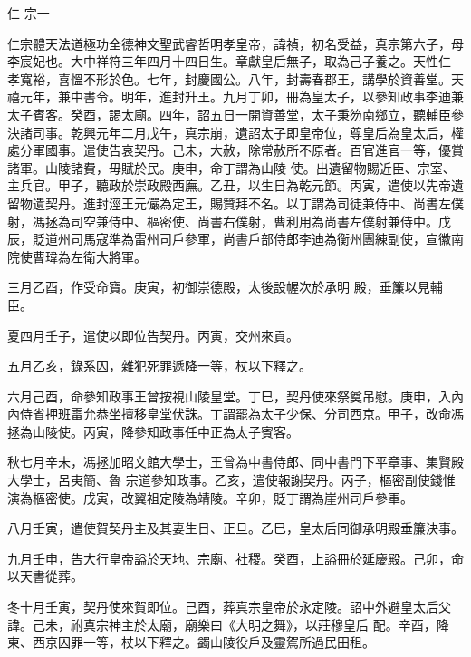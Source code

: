 
\begin{pinyinscope}

 仁
 宗一



 仁宗體天法道極功全德神文聖武睿哲明孝皇帝，諱禎，初名受益，真宗第六子，母李宸妃也。大中祥符三年四月十四日生。章獻皇后無子，取為己子養之。天性仁
 孝寬裕，喜慍不形於色。七年，封慶國公。八年，封壽春郡王，講學於資善堂。天禧元年，兼中書令。明年，進封升王。九月丁卯，冊為皇太子，以參知政事李迪兼太子賓客。癸酉，謁太廟。四年，詔五日一開資善堂，太子秉笏南鄉立，聽輔臣參決諸司事。乾興元年二月戊午，真宗崩，遺詔太子即皇帝位，尊皇后為皇太后，權處分軍國事。遣使告哀契丹。己未，大赦，除常赦所不原者。百官進官一等，優賞諸軍。山陵諸費，毋賦於民。庚申，命丁謂為山陵
 使。出遺留物賜近臣、宗室、主兵官。甲子，聽政於崇政殿西廡。乙丑，以生日為乾元節。丙寅，遣使以先帝遺留物遺契丹。進封涇王元儼為定王，賜贊拜不名。以丁謂為司徒兼侍中、尚書左僕射，馮拯為司空兼侍中、樞密使、尚書右僕射，曹利用為尚書左僕射兼侍中。戊辰，貶道州司馬寇準為雷州司戶參軍，尚書戶部侍郎李迪為衡州團練副使，宣徽南院使曹瑋為左衛大將軍。



 三月乙酉，作受命寶。庚寅，初御崇德殿，太後設幄次於承明
 殿，垂簾以見輔臣。



 夏四月壬子，遣使以即位告契丹。丙寅，交州來貢。



 五月乙亥，錄系囚，雜犯死罪遞降一等，杖以下釋之。



 六月己酉，命參知政事王曾按視山陵皇堂。丁巳，契丹使來祭奠吊慰。庚申，入內內侍省押班雷允恭坐擅移皇堂伏誅。丁謂罷為太子少保、分司西京。甲子，改命馮拯為山陵使。丙寅，降參知政事任中正為太子賓客。



 秋七月辛未，馮拯加昭文館大學士，王曾為中書侍郎、同中書門下平章事、集賢殿大學士，呂夷簡、魯
 宗道參知政事。乙亥，遣使報謝契丹。丙子，樞密副使錢惟演為樞密使。戊寅，改翼祖定陵為靖陵。辛卯，貶丁謂為崖州司戶參軍。



 八月壬寅，遣使賀契丹主及其妻生日、正旦。乙巳，皇太后同御承明殿垂簾決事。



 九月壬申，告大行皇帝謚於天地、宗廟、社稷。癸酉，上謚冊於延慶殿。己卯，命以天書從葬。



 冬十月壬寅，契丹使來賀即位。己酉，葬真宗皇帝於永定陵。詔中外避皇太后父諱。己未，祔真宗神主於太廟，廟樂曰《大明之舞》，以莊穆皇后
 配。辛酉，降東、西京囚罪一等，杖以下釋之。蠲山陵役戶及靈駕所過民田租。




\end{pinyinscope}

